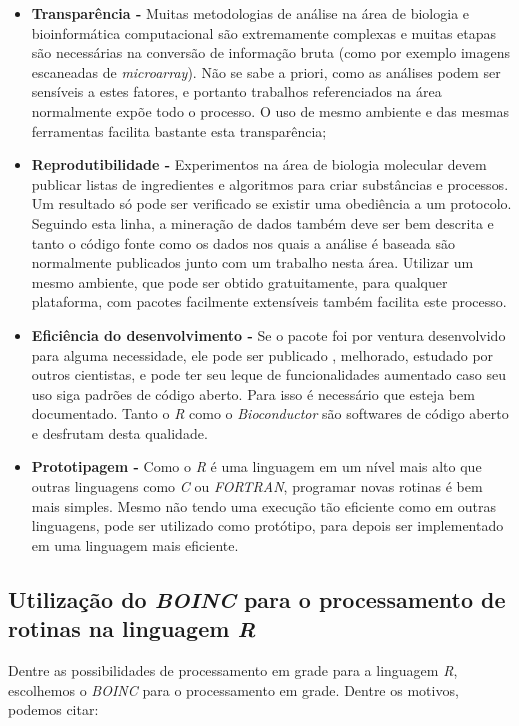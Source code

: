 \begin{itemize}
  \item \textbf{Transparência -} Muitas metodologias de análise na área de biologia e bioinformática computacional
são extremamente complexas e muitas etapas são necessárias na conversão de informação bruta (como por exemplo imagens 
escaneadas de \emph{microarray}). Não se sabe a priori, como as análises podem ser sensíveis a estes fatores, e portanto
trabalhos referenciados na área normalmente expõe todo o processo. O uso de mesmo ambiente e das mesmas ferramentas 
facilita bastante esta transparência;
  \item \textbf{Reprodutibilidade -} Experimentos na área de biologia molecular devem publicar listas de ingredientes
e algoritmos para criar substâncias e processos. Um resultado só pode ser verificado se existir uma obediência a 
um protocolo. Seguindo esta linha, a mineração de dados também deve ser bem descrita e tanto o código fonte 
como os dados nos quais a análise é baseada são normalmente publicados junto com um trabalho nesta área. Utilizar
um mesmo ambiente, que pode ser obtido gratuitamente, para qualquer plataforma, com pacotes 
facilmente extensíveis também facilita este processo.
  \item \textbf{Eficiência do desenvolvimento -} Se o pacote foi por ventura desenvolvido para alguma necessidade, ele pode ser publicado
, melhorado, estudado por outros cientistas, e pode ter seu leque de funcionalidades aumentado caso seu uso siga padrões
de código aberto. Para isso é necessário que esteja bem documentado. Tanto o \emph{R} como o \emph{Bioconductor} são softwares
de código aberto e desfrutam desta qualidade.
  \item \textbf{Prototipagem -} Como o \emph{R} é uma linguagem em um nível mais alto que ou\-tras linguagens como \emph{C} ou
\emph{FORTRAN}, programar novas rotinas é bem mais simples. Mesmo não tendo uma execução tão eficiente como em outras
linguagens, pode ser utilizado como protótipo, para depois ser implementado em uma linguagem mais eficiente. 

\end{itemize}

\subsection{Utilização do \emph{BOINC} para o processamento de rotinas na linguagem \emph{R}}

Dentre as possibilidades de processamento em grade para a linguagem \emph{R}, es\-co\-lhe\-mos o \emph{BOINC} para o processamento em grade.
Dentre os motivos, podemos citar:

